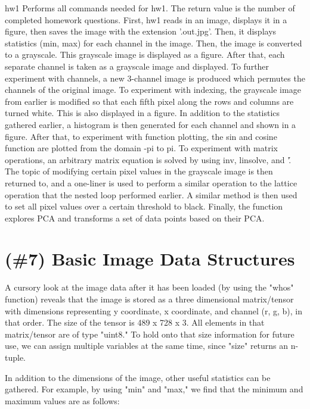 \documentclass{article}
\begin{document}
 hw1 Performs all commands needed for hw1.
    The return value is the number of completed homework questions. First, 
    hw1 reads in an image, displays it in a figure, then saves the
    image with the extension '.out.jpg'. Then, it displays statistics (min, 
    max) for each channel in the image. Then, the image is converted to a
    grayscale. This grayscale image is displayed as a figure. After that,
    each separate channel is taken as a grayscale image and displayed. To
    further experiment with channels, a new 3-channel image is produced
    which permutes the channels of the original image. To experiment with
    indexing, the grayscale image from earlier is modified so that each
    fifth pixel along the rows and columns are turned white. This is also
    displayed in a figure. In addition to the statistics gathered earlier,
    a histogram is then generated for each channel and shown in a figure.
    After that, to experiment with function plotting, the sin and cosine
    function are plotted from the domain -pi to pi. To experiment with
    matrix operations, an arbitrary matrix equation is solved by using
    inv, linsolve, and '\'. The topic of modifying certain pixel values in
    the grayscale image is then returned to, and a one-liner is used to
    perform a similar operation to the lattice operation that the nested 
    loop performed earlier. A similar method is then used to set all pixel
    values over a certain threshold to black. Finally, the function
    explores PCA and transforms a set of data points based on their PCA.

\section{(\#7) Basic Image Data Structures}

A cursory look at the image data after it has been loaded (by using the "whos" 
function) reveals that the image 
is stored as a three dimensional matrix/tensor with dimensions representing y 
coordinate, x coordinate, and channel (r, g, b), in that order. The size of the 
tensor is 489 x 728 x 3. All elements in that matrix/tensor are of type "uint8."
To hold onto that size information for future use, we can assign multiple 
variables at the same time, since "size" returns an n-tuple.

In addition to the dimensions of the image, other useful statistics can be 
gathered. For example, by using "min" and "max," we find that the minimum and maximum values 
are as follows:
\end{document}

